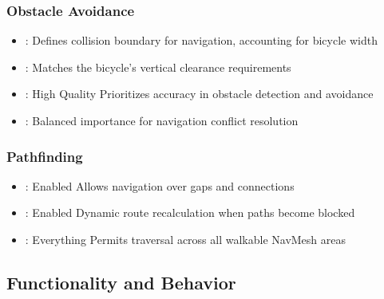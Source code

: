 \documentclass[letterpaper,10pt,english]{jupyterBook}
\begin{document}
\subsubsection{Obstacle Avoidance}
\label{\detokenize{Bicycle Agent:obstacle-avoidance}}\begin{itemize}
\item {} 
\sphinxAtStartPar
{}:  \sphinxhyphen{} Defines collision boundary for navigation, accounting for bicycle width

\item {} 
\sphinxAtStartPar
{}:  \sphinxhyphen{} Matches the bicycle’s vertical clearance requirements

\item {} 
\sphinxAtStartPar
{}: High Quality \sphinxhyphen{} Prioritizes accuracy in obstacle detection and avoidance

\item {} 
\sphinxAtStartPar
{}:  \sphinxhyphen{} Balanced importance for navigation conflict resolution

\end{itemize}


\subsubsection{Pathfinding}
\label{\detokenize{Bicycle Agent:pathfinding}}\begin{itemize}
\item {} 
\sphinxAtStartPar
{}: Enabled \sphinxhyphen{} Allows navigation over gaps and connections

\item {} 
\sphinxAtStartPar
{}: Enabled \sphinxhyphen{} Dynamic route recalculation when paths become blocked

\item {} 
\sphinxAtStartPar
{}: Everything \sphinxhyphen{} Permits traversal across all walkable NavMesh areas

\end{itemize}


\subsection{Functionality and Behavior}
\label{\detokenize{Bicycle Agent:functionality-and-behavior}}
\end{document}
